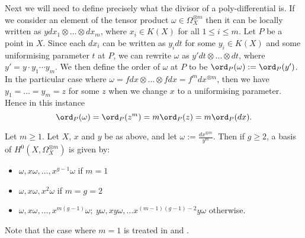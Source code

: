 Next we will need to define precisely what the divisor of a poly-differential is.
If we consider an element of the tensor product $\omega \in \Omega_X^{\otimes m}$ then it can be locally written as $y dx_1\otimes \ldots \otimes dx_m$, where $x_i \in K(X)$ for all $1 \leq i \leq m$.
Let $P$ be a point in $X$.
Since each $dx_i$ can be written as $y_i dt$ for some $y_i\in K(X)$ and some uniformising parameter $t$ at $P$, we can rewrite $\omega$ as $y' dt \otimes \ldots \otimes dt$, where $y' = y \cdot y_1 \cdots y_m$.
We then define the order of $\omega$ at $P$ to be $\ord_P(\omega ) := \ord_P(y')$.
In the particular case where $\omega = fdx \otimes \ldots \otimes fdx = f^m dx^{\otimes m}$, then we have $y_1 = \ldots = y_m = z$ for some $z$ when we change $x$ to a uniformising parameter.
Hence in this instance 
    \[ 
    \ord_P(\omega) = \ord_P(z^m) = m\ord_P(z) = m\ord_P(dx).
    \]



    \begin{prop}\label{prophyperellipticbasispnot2}
    Let $m\geq 1$.
    Let $X$, $x$ and $y$ be as above, and let $\omega := \frac{dx^{\otimes m}}{y^m}$. 
    Then if $g\geq 2$, a basis of $H^0(X,\Omega_X^{\otimes m})$ is given by:
        \begin{itemize}
        \item $\omega, x\omega, \ldots , x^{g-1}\omega$ if $m=1$ 
        \item $\omega, x\omega, x^2\omega$  if $m=g=2$ 
        \item $\omega, x\omega, \ldots, x^{m(g-1)}\omega;\  y\omega, xy\omega, \ldots x^{(m-1)(g-1)-2}y\omega$ otherwise.
        \end{itemize}
    \end{prop}
    
    \begin{rem}
    Note that the case where $m=1$ is treated in \cite[Prop. 7.4.26]{liu} and \cite[Ch. IV, \S 4, Prop. 4.3]{griffiths}.
    \end{rem}
    
